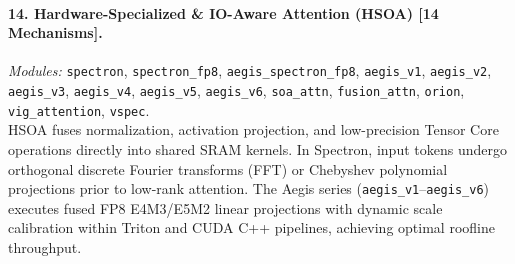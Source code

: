 \paragraph{14. Hardware-Specialized \& IO-Aware Attention (HSOA) [14 Mechanisms].}
\textit{Modules:} \texttt{spectron}, \texttt{spectron\_fp8}, \texttt{aegis\_spectron\_fp8}, \texttt{aegis\_v1}, \texttt{aegis\_v2}, \texttt{aegis\_v3}, \texttt{aegis\_v4}, \texttt{aegis\_v5}, \texttt{aegis\_v6}, \texttt{soa\_attn}, \texttt{fusion\_attn}, \texttt{orion}, \texttt{vig\_attention}, \texttt{vspec}. \\
HSOA fuses normalization, activation projection, and low-precision Tensor Core operations directly into shared SRAM kernels. In Spectron, input tokens undergo orthogonal discrete Fourier transforms (FFT) or Chebyshev polynomial projections prior to low-rank attention. The Aegis series (\texttt{aegis\_v1}--\texttt{aegis\_v6}) executes fused FP8 E4M3/E5M2 linear projections with dynamic scale calibration within Triton and CUDA C++ pipelines, achieving optimal roofline throughput.

